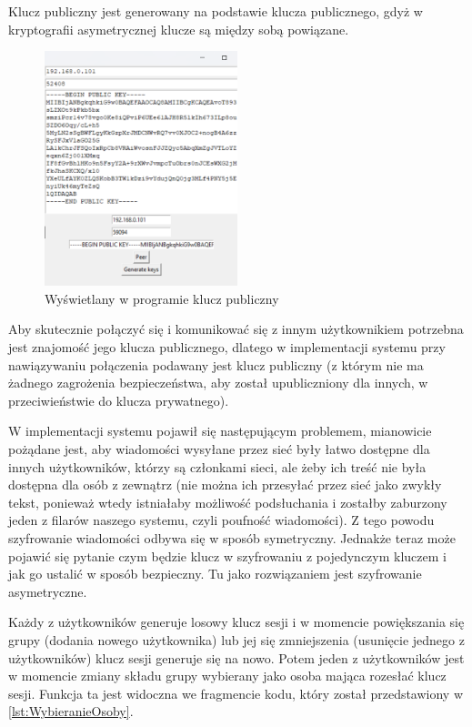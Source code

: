 Klucz publiczny jest generowany na podstawie klucza publicznego, gdyż w kryptografii asymetrycznej klucze są między sobą powiązane.
\begin{figure}[h]
    \centering
    \includegraphics[width=0.5\textwidth]{Images/CodeX13.png}
    \caption{Wyświetlany w programie klucz publiczny}
    \label{fig:KluczPubliczny}
\end{figure}
\newline Aby skutecznie połączyć się i komunikować się z innym użytkownikiem potrzebna jest znajomość jego klucza publicznego, dlatego w implementacji systemu przy nawiązywaniu połączenia podawany jest klucz publiczny (z którym nie ma żadnego zagrożenia bezpieczeństwa, aby został upubliczniony dla innych, w przeciwieństwie do klucza prywatnego).

W implementacji systemu pojawił się następującym problemem, mianowicie pożądane jest, aby wiadomości wysyłane przez sieć były łatwo dostępne dla innych użytkowników, którzy są członkami sieci, ale żeby ich treść nie była dostępna dla osób z zewnątrz (nie można ich przesyłać przez sieć jako zwykły tekst, ponieważ wtedy istniałaby możliwość podsłuchania i zostałby zaburzony jeden z filarów naszego systemu, czyli poufność wiadomości). Z tego powodu szyfrowanie wiadomości odbywa się w sposób symetryczny. Jednakże teraz może pojawić się pytanie czym będzie klucz w szyfrowaniu z pojedynczym kluczem i jak go ustalić w sposób bezpieczny. Tu jako rozwiązaniem jest szyfrowanie asymetryczne.

Każdy z użytkowników generuje losowy klucz sesji i w momencie powiększania się grupy (dodania nowego użytkownika) lub jej się zmniejszenia (usunięcie jednego z użytkowników) klucz sesji generuje się na nowo. Potem jeden z użytkowników jest w momencie zmiany składu grupy wybierany jako osoba mająca rozesłać klucz sesji. Funkcja ta jest widoczna we fragmencie kodu, który został przedstawiony w \lstlistingname{ \ref{lst:WybieranieOsoby}}.

